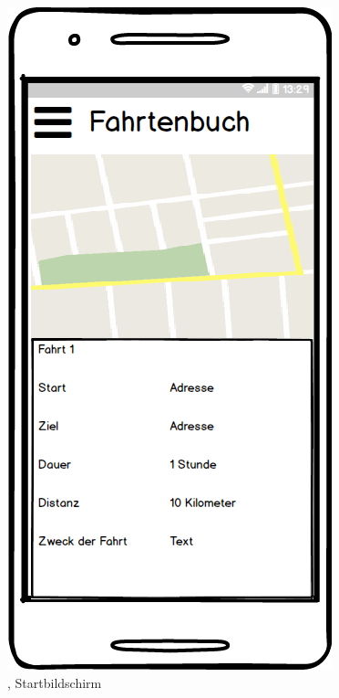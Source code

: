 \documentclass[a4paper]{article}
\begin{document}
\begin{figure}
	\begin{minipage}[b]{0.3\textwidth}
        \includegraphics[width=\textwidth]{img/mock4}
        \caption{\label{img:img/mock4}, Startbildschirm}

\end{minipage}
\end{figure}
\end{document}
